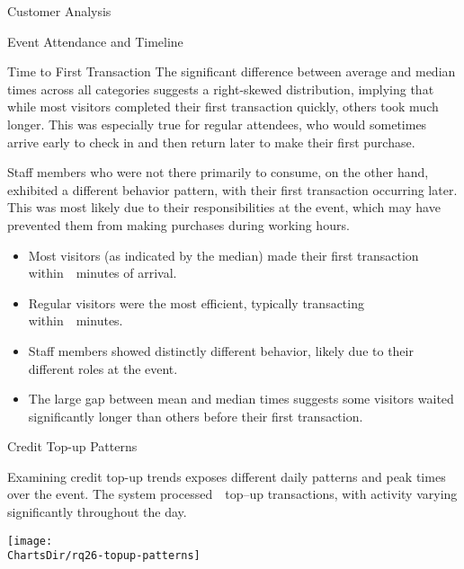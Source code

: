 \begin{section}{Customer Analysis}
\begin{subsection}{Event Attendance and Timeline}
\begin{subsubsection}{Time to First Transaction}
			The significant difference between average and median times across all categories suggests a right-skewed distribution, implying that while most visitors completed their first transaction quickly, others took much longer.
			This was especially true for regular attendees, who would sometimes arrive early to check in and then return later to make their first purchase.

			Staff members who were not there primarily to consume, on the other hand, exhibited a different behavior pattern, with their first transaction occurring later.
			This was most likely due to their responsibilities at the event, which may have prevented them from making purchases during working hours.

			\begin{keytakeaways}
				\begin{itemize}
					\item Most visitors (as indicated by the median) made their first transaction within~~minutes of arrival.
					\item Regular visitors were the most efficient, typically transacting within~~minutes.
					\item Staff members showed distinctly different behavior, likely due to their different roles at the event.
					\item The large gap between mean and median times suggests some visitors waited significantly longer than others before their first transaction.
				\end{itemize}
			\end{keytakeaways}
		\end{subsubsection}

		\begin{subsubsection}{Credit Top-up Patterns}
			\label{subsubsec:analysis-credit-topup}


			Examining credit top-up trends exposes different daily patterns and peak times over the event.
			The system processed~~top–up transactions, with activity varying significantly throughout the day.

			\begin{chart}[h]
				\centering
				\texttt{[image: \\ChartsDir/rq26-topup-patterns]}
				\caption{ Credit Top-up Patterns During Event}
				\label{chart:topup-patterns}
				\source
			\end{chart}


\end{subsubsection}
\end{subsection}
\end{section}
